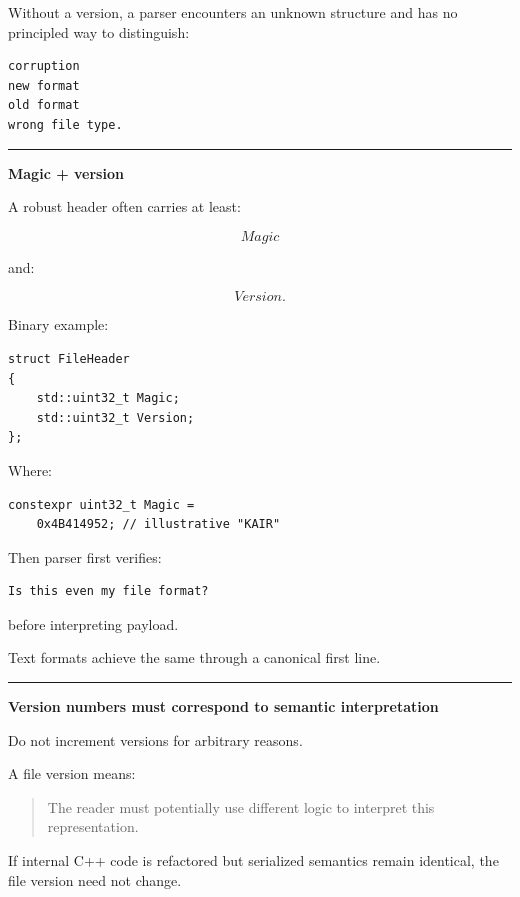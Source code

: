 Without a version, a parser encounters an unknown structure and has no principled way to distinguish:

\begin{verbatim}
corruption
new format
old format
wrong file type.
\end{verbatim}

\begin{center}\rule{0.5\linewidth}{0.5pt}\end{center}

\textbf{Magic + version}

A robust header often carries at least:

\[
Magic
\]

and:

\[
Version.
\]

Binary example:

\begin{verbatim}
struct FileHeader
{
    std::uint32_t Magic;
    std::uint32_t Version;
};
\end{verbatim}

Where:

\begin{verbatim}
constexpr uint32_t Magic =
    0x4B414952; // illustrative "KAIR"
\end{verbatim}

Then parser first verifies:

\begin{verbatim}
Is this even my file format?
\end{verbatim}

before interpreting payload.

Text formats achieve the same through a canonical first line.

\begin{center}\rule{0.5\linewidth}{0.5pt}\end{center}

\textbf{Version numbers must correspond to semantic interpretation}

Do not increment versions for arbitrary reasons.

A file version means:

\begin{quote}
The reader must potentially use different logic to interpret this representation.
\end{quote}

If internal C++ code is refactored but serialized semantics remain identical, the file version need not change.


